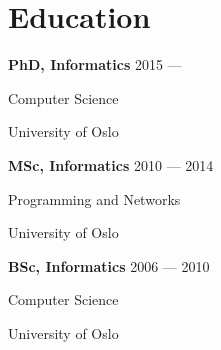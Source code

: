 \section{Education}
\parbox[t][][t]{\linewidth}{
	\parbox{\linewidth}{\textbf{PhD, Informatics} \hfill {{2015 --- \phantom{2018}}}}
	\parbox{\linewidth}{{Computer Science}}
	\parbox{\linewidth}{{University of Oslo}}
	\smallskip
}

\parbox[t][][t]{\linewidth}{
	\parbox{\linewidth}{\textbf{MSc, Informatics} \hfill {{2010 --- 2014}}}
	\parbox{\linewidth}{{Programming and Networks}}
	\parbox{\linewidth}{{University of Oslo}}
	\smallskip
}

\parbox[t][][t]{\linewidth}{
	\parbox{\linewidth}{\textbf{BSc, Informatics} \hfill {{2006 --- 2010}}}
	\parbox{\linewidth}{{Computer Science}}
	\parbox{\linewidth}{{University of Oslo}}
	\smallskip
}


